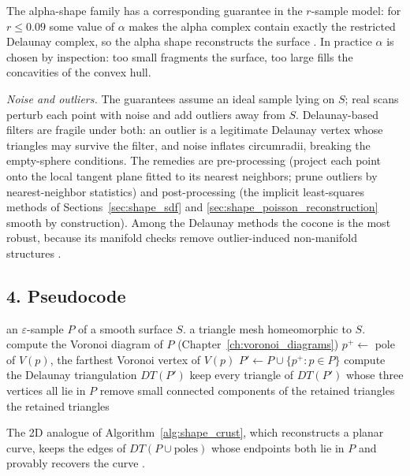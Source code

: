 The alpha-shape family has a corresponding guarantee in the $r$-sample model:
for $r \le 0.09$ some value of $\alpha$ makes the alpha complex contain exactly
the restricted Delaunay complex, so the alpha shape reconstructs the surface
\cite{boissonnat2005}. In practice $\alpha$ is chosen by inspection: too small
fragments the surface, too large fills the concavities of the convex hull.

\emph{Noise and outliers.} The guarantees assume an ideal sample lying on $S$;
real scans perturb each point with noise and add outliers away from $S$.
Delaunay-based filters are fragile under both: an outlier is a legitimate
Delaunay vertex whose triangles may survive the filter, and noise inflates
circumradii, breaking the empty-sphere conditions. The remedies are
pre-processing (project each point onto the local tangent plane fitted to its
nearest neighbors; prune outliers by nearest-neighbor statistics) and
post-processing (the implicit least-squares methods of
Sections~\ref{sec:shape_sdf} and \ref{sec:shape_poisson_reconstruction} smooth
by construction). Among the Delaunay methods the cocone is the most robust,
because its manifold checks remove outlier-induced non-manifold structures
\cite{amenta2000,dey2007}.

\subsection{4. Pseudocode}

\begin{algorithm}[htbp]
\caption{Crust (Amenta--Bern)}
\label{alg:shape_crust}
\begin{algorithmic}[1]
\Require an $\varepsilon$-sample $P$ of a smooth surface $S$.
\Ensure a triangle mesh homeomorphic to $S$.
  \State compute the Voronoi diagram of $P$ (Chapter~\ref{ch:voronoi_diagrams})
    \State $p^{+} \gets$ pole of $V(p)$, the farthest Voronoi vertex of $V(p)$
  \EndFor
  \State $P' \gets P \cup \{ p^{+} : p \in P \}$
  \State compute the Delaunay triangulation $DT(P')$
  \State keep every triangle of $DT(P')$ whose three vertices all lie in $P$
  \State remove small connected components of the retained triangles
  \State \Return the retained triangles
\EndFunction
\end{algorithmic}
\end{algorithm}

The 2D analogue of Algorithm~\ref{alg:shape_crust}, which reconstructs a planar
curve, keeps the edges of $DT(P \cup \text{poles})$ whose endpoints both lie in
$P$ and provably recovers the curve \cite{amenta1998}.

